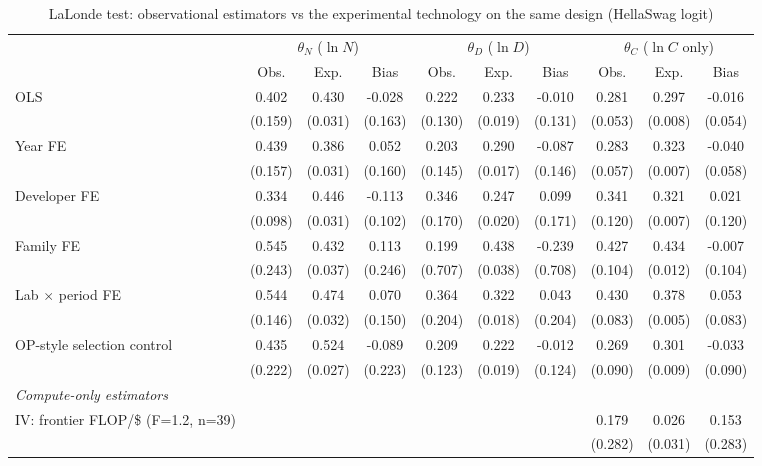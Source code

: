 \begin{table}[!htbp]
\centering
\scriptsize
\begin{threeparttable}
\caption{LaLonde test: observational estimators vs the experimental technology on the same design (HellaSwag logit)}
\label{tab:table6_lalonde_ladderonly}
\begin{tabular}{lccccccccc}
\toprule
\multicolumn{1}{c}{} & \multicolumn{3}{c}{$\theta_N$ ($\ln N$)} & \multicolumn{3}{c}{$\theta_D$ ($\ln D$)} & \multicolumn{3}{c}{$\theta_C$ ($\ln C$ only)} \\ \cmidrule(lr){2-4}\cmidrule(lr){5-7}\cmidrule(lr){8-10}
 & Obs. & Exp. & Bias & Obs. & Exp. & Bias & Obs. & Exp. & Bias \\
\midrule
OLS & 0.402 & 0.430 & -0.028 & 0.222 & 0.233 & -0.010 & 0.281 & 0.297 & -0.016 \\
 & (0.159) & (0.031) & (0.163) & (0.130) & (0.019) & (0.131) & (0.053) & (0.008) & (0.054) \\
Year FE & 0.439 & 0.386 & 0.052 & 0.203 & 0.290 & -0.087 & 0.283 & 0.323 & -0.040 \\
 & (0.157) & (0.031) & (0.160) & (0.145) & (0.017) & (0.146) & (0.057) & (0.007) & (0.058) \\
Developer FE & 0.334 & 0.446 & -0.113 & 0.346 & 0.247 & 0.099 & 0.341 & 0.321 & 0.021 \\
 & (0.098) & (0.031) & (0.102) & (0.170) & (0.020) & (0.171) & (0.120) & (0.007) & (0.120) \\
Family FE & 0.545 & 0.432 & 0.113 & 0.199 & 0.438 & -0.239 & 0.427 & 0.434 & -0.007 \\
 & (0.243) & (0.037) & (0.246) & (0.707) & (0.038) & (0.708) & (0.104) & (0.012) & (0.104) \\
Lab $\times$ period FE & 0.544 & 0.474 & 0.070 & 0.364 & 0.322 & 0.043 & 0.430 & 0.378 & 0.053 \\
 & (0.146) & (0.032) & (0.150) & (0.204) & (0.018) & (0.204) & (0.083) & (0.005) & (0.083) \\
OP-style selection control & 0.435 & 0.524 & -0.089 & 0.209 & 0.222 & -0.012 & 0.269 & 0.301 & -0.033 \\
 & (0.222) & (0.027) & (0.223) & (0.123) & (0.019) & (0.124) & (0.090) & (0.009) & (0.090) \\
\midrule
\multicolumn{10}{l}{\textit{Compute-only estimators}} \\
IV: frontier FLOP/\$ (F=1.2, n=39) &  &  &  &  &  &  & 0.179 & 0.026 & 0.153 \\
 &  &  &  &  &  &  & (0.282) & (0.031) & (0.283) \\

\end{tabular}
\end{threeparttable}
\end{table}
